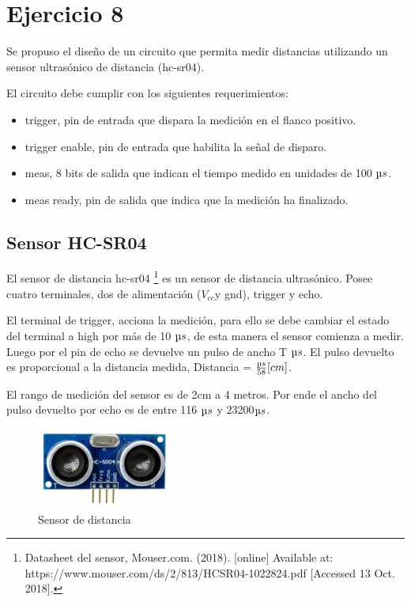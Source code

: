 \documentclass[../../e3_tp2_main.tex]{subfiles}
\begin{document}
\section{Ejercicio 8}

Se propuso el diseño de un circuito que permita medir distancias utilizando un sensor ultrasónico de distancia (hc-sr04).
\par El circuito debe cumplir con los siguientes requerimientos: 
\begin{itemize}  
\item trigger, pin de entrada que dispara la medición en el flanco positivo. 
\item trigger enable, pin de entrada que habilita la señal de disparo.
\item meas, 8 bits de salida que indican el tiempo medido en unidades de 100 $\micro s$.
\item meas ready, pin de salida que indica que la medición ha finalizado. 
\end{itemize}

\subsection{Sensor HC-SR04}

El sensor de distancia hc-sr04
\footnote{Datasheet del sensor, Mouser.com. (2018). [online] Available at: https://www.mouser.com/ds/2/813/HCSR04-1022824.pdf [Accessed 13 Oct. 2018].}
 es un sensor de distancia ultrasónico. Posee cuatro terminales, dos de alimentación ($V_{cc}$y gnd), trigger y echo.
\par El terminal de trigger, acciona la medición, para ello se debe cambiar el estado del terminal a high por más de 10 $\micro s$, de esta manera el sensor comienza a medir. Luego por el pin de echo se devuelve un pulso de ancho T $\micro s$.
 El pulso devuelto es proporcional a  la distancia medida, Distancia = $ \frac {\micro s}{58}[cm]$.
\par El rango de medición del sensor es de 2cm a 4 metros. Por ende el ancho del pulso devuelto por echo es de entre 116 $\micro s$ y 23200$\micro s$.
\begin{figure}[H]	
	\centering
	\includegraphics[width=0.4\textwidth]{imagenes/sensor.jpg}
	\caption{Sensor de distancia}
\end{figure}
\end{document}
